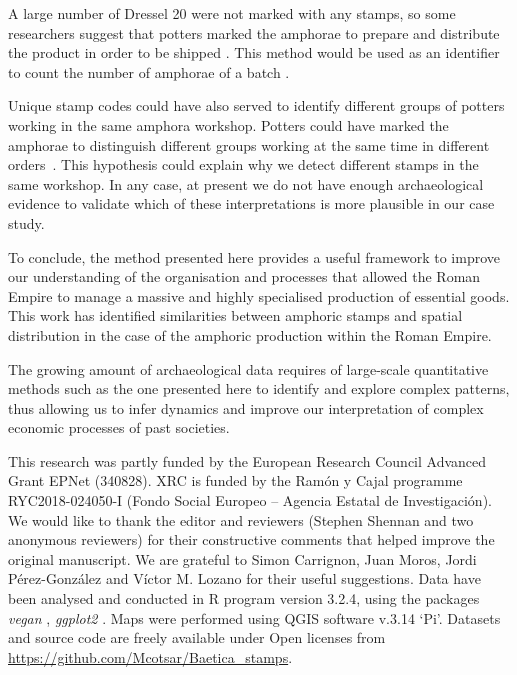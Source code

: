  
A large number of Dressel 20 were not marked with any stamps, so some researchers suggest that potters marked the amphorae to prepare and distribute the product in order to be shipped \citep{berni_millet_epigrafianforica_2008}. This method would be used as an identifier to count the number of amphorae of a batch \citep{juanmorostesis}. 

Unique stamp codes could have also served to identify different groups of potters working in the same amphora workshop. Potters could have marked the amphorae to distinguish different groups working at the same time in different orders~\citep{li_crossbows_2014}. This hypothesis could explain why we detect different stamps in the same workshop. In any case, at present we do not have enough archaeological evidence to validate which of these interpretations is more plausible in our case study.

To conclude, the method presented here provides a useful framework to improve our understanding of the organisation and processes that allowed the Roman Empire to manage a massive and highly specialised production of essential goods. This work has identified similarities between amphoric stamps and spatial distribution in the case of the amphoric production within the Roman Empire.

The growing amount of archaeological data requires of large-scale quantitative methods such as the one presented here to identify and explore complex patterns, thus allowing us to infer dynamics and improve our interpretation of complex economic processes of past societies. 



\begin{acknowledgements}

This research was partly funded by the European Research Council Advanced Grant EPNet (340828). XRC is funded by the Ram\'on y Cajal programme RYC2018-024050-I (Fondo Social Europeo – Agencia Estatal de Investigaci\'on). We would like to thank the editor and reviewers (Stephen Shennan
and two anonymous reviewers) for their constructive comments that helped improve the original manuscript. We are grateful to Simon Carrignon, Juan Moros, Jordi P\'erez-Gonz\'alez and V\'ictor M. Lozano for their useful suggestions.  
Data have been analysed and conducted in R program version 3.2.4, using the packages \textit{vegan} \citep{oksanen_vegan_2007}, \textit{ggplot2} \citep{ggplot2:_2016}. Maps were performed using QGIS software v.3.14 `Pi'. Datasets and source code are freely available under Open licenses from \url{https://github.com/Mcotsar/Baetica\_stamps}.

\end{acknowledgements}




